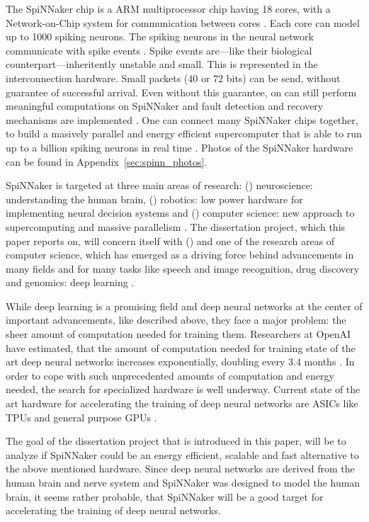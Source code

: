 \documentclass{article}
\begin{document}
The SpiNNaker chip is a ARM multiprocessor chip having 18
cores, with a Network-on-Chip system for
communication between cores \citep{furber_et_al_2007,
  spinn_proj}.
Each core can model up to 1000 spiking neurons.
The spiking neurons in the neural network communicate with
spike events \citep{furber_et_al_2007}.
Spike events are---like their biological
counterpart---inheritently unstable and small.
This is represented in the interconnection hardware.
Small packets (40 or 72 bits) can be send, without
guarantee of successful arrival.
Even without this guarantee, on can still perform
meaningful computations on SpiNNaker and fault detection
and recovery mechanisms are implemented \citep{spinn_proj}.
One can connect many SpiNNaker chips together, to build a
masively parallel and energy efficient supercomputer that
is able to run up to a billion spiking neurons in real time
\citep{furber_et_al_2007}.
Photos of the SpiNNaker hardware can be found in
Appendix~\ref{sec:spinn_photos}.

SpiNNaker is targeted at three main areas of research:
() neuroscience: understanding the human
brain, () robotics: low power hardware for
implementing neural decision systems and
() computer science: new approach to
supercomputing and massive parallelism \citep{spinn_proj}.
The dissertation project, which this paper reports on,
will concern itself with () and one of the
research areas of computer science, which has emerged as
a driving force behind advancements in many fields and for
many tasks like speech and image recognition, drug
discovery and genomics: deep learning
\citep{lecun_et_al_2015}.

While deep learning is a promising field and deep neural
networks at the center of important advancements, like
described above, they face a major problem: the sheer
amount of computation needed for training them.
Researchers at OpenAI have estimated, that the amount of
computation needed for training state of the art deep
neural networks increases exponentially, doubling every
3.4 months \citep{openai2019}.
In order to cope with such unprecedented amounts of
computation and energy needed, the search for specialized
hardware is well underway.
Current state of the art hardware for accelerating the
training of deep neural networks are ASICs like TPUs and
general purpose GPUs \citep{tpus, mittal_et_al_2019}.

The goal of the dissertation project that is introduced in
this paper, will be to analyze if SpiNNaker could be an
energy efficient, scalable and fast alternative to the
above mentioned hardware.
Since deep neural networks are derived from the human
brain and nerve system \citep{goodfellow2016} and SpiNNaker
was designed to model the human brain, it seems rather
probable, that SpiNNaker will be a good target for
accelerating the training of deep neural networks.
\end{document}
